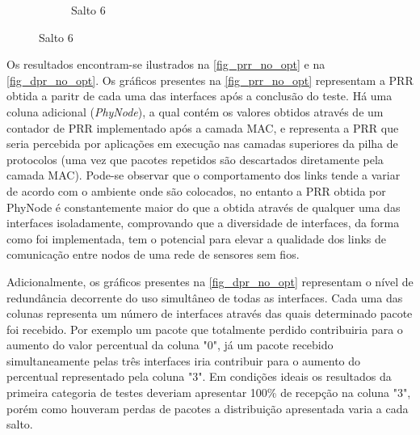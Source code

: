 \documentclass[
	12pt,				%
	openright,			%
	oneside,
	a4paper,			%
	english,			%
	french,				%
	spanish,			%
	brazil				%
	]{abntex2}
\begin{document}
\begin{figure}[tb]
\begin{subfigure}{.5\textwidth}
		\captionsetup{width=.9\textwidth}
		\caption{Salto 6}
		\label{dpr_no_opt_s6}
	\end{subfigure}
\end{figure}

Os resultados encontram-se ilustrados na \autoref{fig_prr_no_opt} e na \autoref{fig_dpr_no_opt}. Os gráficos presentes na \autoref{fig_prr_no_opt} representam a PRR obtida a paritr de cada uma das interfaces após a conclusão do teste. Há uma coluna adicional (\textit{PhyNode}), a qual contém os valores obtidos através de um contador de PRR implementado após a camada MAC, e representa a PRR que seria percebida por aplicações em execução nas camadas superiores da pilha de protocolos (uma vez que pacotes repetidos são descartados diretamente pela camada MAC). Pode-se observar que o comportamento dos links tende a variar de acordo com o ambiente onde são colocados, no entanto a PRR obtida por PhyNode é constantemente maior do que a obtida através de qualquer uma das interfaces isoladamente, comprovando que a diversidade de interfaces, da forma como foi implementada, tem o potencial para elevar a qualidade dos links de comunicação entre nodos de uma rede de sensores sem fios.

Adicionalmente, os gráficos presentes na \autoref{fig_dpr_no_opt} representam o nível de redundância decorrente do uso simultâneo de todas as interfaces. Cada uma das colunas representa um número de interfaces através das quais determinado pacote foi recebido. Por exemplo um pacote que totalmente perdido contribuiria para o aumento do valor percentual da coluna "0", já um pacote recebido simultaneamente pelas três interfaces iria contribuir para o aumento do percentual representado pela coluna "3". Em condições ideais os resultados da primeira categoria de testes deveriam apresentar 100\% de recepção na coluna "3", porém como houveram perdas de pacotes a distribuição apresentada varia a cada salto.
\end{document}
